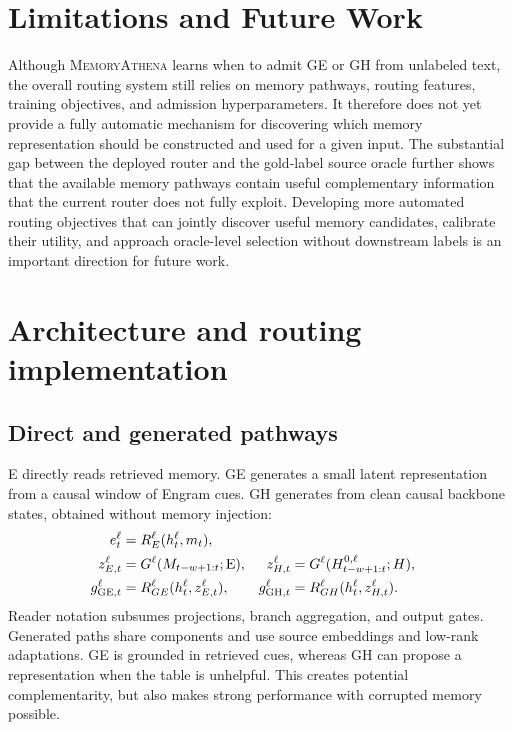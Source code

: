 \section{Limitations and Future Work}

Although \textsc{MemoryAthena} learns when to admit GE or GH from unlabeled
text, the overall routing system still relies on memory
pathways, routing features, training objectives, and admission hyperparameters.
It therefore does not yet provide a fully automatic mechanism for discovering
which memory representation should be constructed and used for a given input.
The substantial gap between the deployed router and the gold-label source
oracle further shows that the available memory pathways contain useful
complementary information that the current router does not fully exploit.
Developing more automated routing objectives that can jointly discover useful
memory candidates, calibrate their utility, and approach oracle-level selection
without downstream labels is an important direction for future work.

\section{Architecture and routing implementation}\label{app:implementation}

\subsection{Direct and generated pathways}

E directly reads retrieved memory. GE generates a small latent representation from a causal window of Engram cues. GH generates from clean causal backbone states, obtained without memory injection:
\begin{align}
 e_t^\ell &=R_E^\ell(h_t^\ell,m_t), \nonumber\\
 z_{E,t}^\ell &=G^\ell(M_{t-w+1:t};\mathrm{E}),&
 z_{H,t}^\ell &=G^\ell(H^{0,\ell}_{t-w+1:t};H), \label{eq:sources}\\
 g_{\mathrm{GE},t}^\ell &=R_{GE}^\ell(h_t^\ell,z_{E,t}^\ell),&
 g_{\mathrm{GH},t}^\ell &=R_{GH}^\ell(h_t^\ell,z_{H,t}^\ell).\nonumber
\end{align}
Reader notation subsumes projections, branch aggregation, and output gates. Generated paths share components and use source embeddings and low-rank adaptations. GE is grounded in retrieved cues, whereas GH can propose a representation when the table is unhelpful. This creates potential complementarity, but also makes strong performance with corrupted memory possible.

